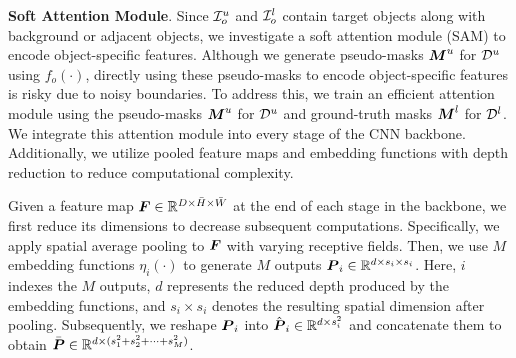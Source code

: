 %
%




\vspace{1mm}
\noindent \textbf{Soft Attention Module}. 
Since $\mathcal{I}^u_o$ and $\mathcal{I}^l_o$ contain target objects along with background or adjacent objects, we investigate a soft attention module (SAM) to encode object-specific features. Although we generate pseudo-masks $\boldsymbol{M}^u$ for $\mathcal{D}^u$ using $f_o(\cdot)$, directly using these pseudo-masks to encode object-specific features is risky due to noisy boundaries. To address this, we train an efficient attention module using the pseudo-masks $\boldsymbol{M}^u$ for $\mathcal{D}^u$ and ground-truth masks $\boldsymbol{M}^l$ for $\mathcal{D}^l$. We integrate this attention module into every stage of the CNN backbone. Additionally, we utilize pooled feature maps and embedding functions with depth reduction to reduce computational complexity.


Given a feature map $\boldsymbol{F} \in \mathbb{R}^{D \times \bar{H} \times \bar{W}}$ at the end of each stage in the backbone, we first reduce its dimensions to decrease subsequent computations. Specifically, we apply spatial average pooling to $\boldsymbol{F}$ with varying receptive fields. Then, we use $M$ embedding functions $\eta_i(\cdot)$ to generate $M$ outputs $\boldsymbol{P}_i \in \mathbb{R}^{d \times s_i \times s_i}$. Here, $i$ indexes the $M$ outputs, $d$ represents the reduced depth produced by the embedding functions, and $s_i \times s_i$ denotes the resulting spatial dimension after pooling. Subsequently, we reshape $\boldsymbol{P}_i$ into $\hat{\boldsymbol{P}}_i \in \mathbb{R}^{d \times s_i^2}$ and concatenate them to obtain $\bar{\boldsymbol{P}} \in \mathbb{R}^{d \times (s_1^2 + s_2^2 + \cdots + s_M^2)}$.

